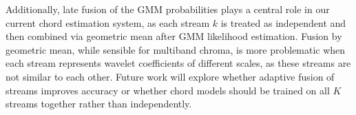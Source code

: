 \documentclass{article}
\begin{document}
Additionally, late fusion of the GMM probabilities plays a central role in our current chord estimation system, as each stream $k$ is treated as independent and then combined via geometric mean after GMM likelihood estimation. Fusion by geometric mean, while sensible for multiband chroma, is more problematic when each stream represents wavelet coefficients of different scales, as these streams are not similar to each other. Future work will explore whether adaptive fusion of streams improves accuracy or whether chord models should be trained on all $K$ streams together rather than independently. 



%

%
%
%
%
\end{document}
